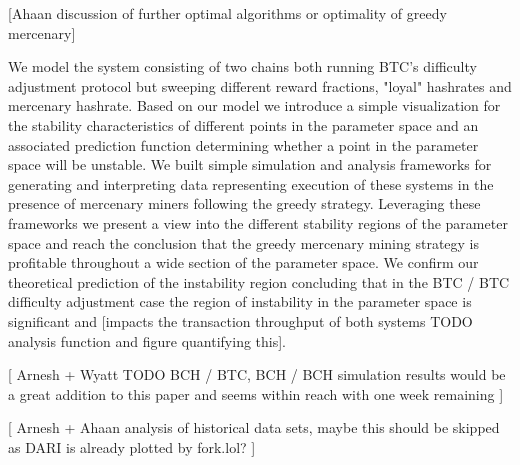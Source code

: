 \documentclass[10pt, preprint]{aastex}
\begin{document}
[Ahaan discussion of further optimal algorithms or optimality of greedy mercenary]

We model the system consisting of two chains both running BTC's difficulty adjustment protocol but sweeping different reward fractions, "loyal" hashrates and mercenary hashrate.  Based on our model we introduce a simple visualization for the stability characteristics of different points in the parameter space and an associated prediction function determining whether a point in the parameter space will be unstable. We built simple simulation and analysis frameworks for generating and interpreting data representing execution of these systems in the presence of mercenary miners following the greedy strategy.  Leveraging these frameworks we present a view into the different stability regions of the parameter space and reach the conclusion that the greedy mercenary mining strategy is profitable throughout a wide section of the parameter space.  We confirm our theoretical prediction of the instability region concluding that in the BTC / BTC difficulty adjustment case the region of instability in the parameter space is significant and  [impacts the transaction throughput of both systems TODO analysis function and figure quantifying this]. 

[ Arnesh + Wyatt TODO BCH / BTC, BCH / BCH simulation results would be a great addition to this paper and seems within reach with one week remaining ] 

[ Arnesh + Ahaan analysis of historical data sets, maybe this should be skipped as DARI is already plotted by fork.lol? ]
\end{document}
